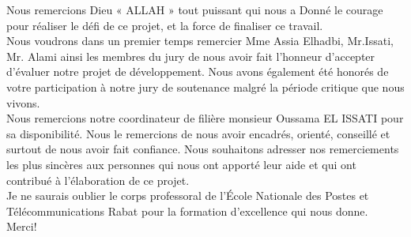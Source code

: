 
\usetikzlibrary{fadings,backgrounds}


\thispagestyle{empty}
%
\vfill 
\begin{center}
	\parbox{.77\linewidth}{  \centering 
		\baselineskip=8mm 
		\selectfont 
		\Large 
		Nous remercions Dieu « ALLAH » tout puissant qui nous a
		Donné le courage pour réaliser le défi de ce projet, et la force de
		finaliser ce travail.
		\\[5mm]
		Nous voudrons dans un premier temps remercier Mme Assia
		Elhadbi, Mr.Issati, Mr. Alami ainsi les membres du jury de nous
		avoir fait l’honneur d’accepter d’évaluer notre projet de
		développement. Nous avons également été honorés de votre
		participation à notre jury de soutenance malgré la période critique
		que nous vivons.
		\\[5mm]
		Nous remercions notre coordinateur de filière monsieur Oussama
		EL ISSATI pour sa disponibilité. Nous le remercions de nous avoir
		encadrés, orienté, conseillé et surtout de nous avoir fait confiance.
		Nous souhaitons adresser nos remerciements les plus sincères
		aux personnes qui nous ont apporté leur aide et qui ont contribué à
		l’élaboration de ce projet.
		\\[5mm]
		Je ne saurais oublier le corps professoral de l’École Nationale des Postes et
		Télécommunications Rabat pour la formation d’excellence qui nous donne.
		\\[5mm]
		Merci!}
\end{center}
\vfill 
\vskip11mm
\newpage
